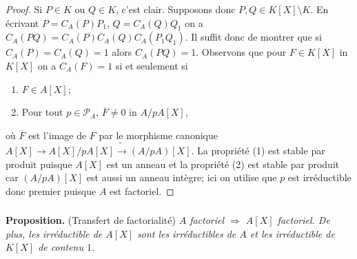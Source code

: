 \documentclass[a4paper, 12pt]{amsart}
\begin{document}
\begin{proof}Si $P\in K$ ou $Q\in K$, c'est clair. Supposons donc $P,Q\in K[X]\setminus K$. En écrivant $P=C_A(P)P_1$, $Q=C_A(Q)Q_1$ on a $C_A(PQ)=C_A(P)C_A(Q)C_A(P_1Q_1)$. Il suffit donc de montrer que si $C_A(P)=C_A(Q)=1$ alors $C_A(PQ)=1$. Observons que pour $F\in K[X]$ in $K[X]$ on a  $C_A(F)=1$ si et seulement si
\begin{enumerate}
\item $F\in A[X]$;
\item  Pour tout $p\in\mathcal{P}_A$, $\overline{F}\not=0$ in $A/pA[X]$, 
\end{enumerate}
o\`u $\overline{F}$ est l'image de $F$ par le morphisme canonique $A[X]\rightarrow A[X]/pA[X]\tilde{\rightarrow} (A/pA)[X]$. La propriété (1) est  stable par produit puisque $A[X]$ est un anneau et la propriété (2) est stable par produit car $(A/pA)[X]$ est aussi un anneau intègre; ici on utilise que $p$ est irréductible donc premier puisque $A$ est factoriel.\end{proof}
%
%



\subsubsection{}\label{FactTransfert}\textbf{Proposition.} (Transfert de factorialité) \textit{$A$ factoriel $\Rightarrow$ $A[X]$ factoriel. De plus, les  irréductible de $A[X]$ sont les irréductibles de $A$ et les irréductible de $K[X]$ de contenu $1$.}\\
\end{document}
